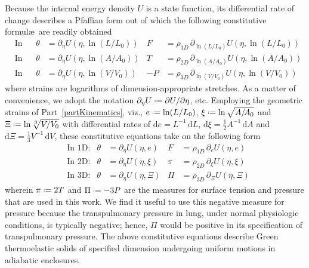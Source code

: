 Because the internal energy density $U$ is a state function, its differential rate of change describes a Pfaffian form \cite{Caratheodory09} out of which the following constitutive formul\ae\ are readily obtained
\begin{subequations}
    \label{GreenElasticCEs}
    \begin{align}
    \mbox{} & \text{In 1D:} & 
    \theta & = \partial_{\eta} U ( \eta , \ln (L/L_0)) &
    F & = \rho_{1D} \, \partial_{\ln(L/L_0)} U ( \eta , \ln (L/L_0) ) \\
    \mbox{} & \text{In 2D:} &
    \theta & = \partial_{\eta} U ( \eta , \ln (A / \! A_0) ) &
    T & = \rho_{2D} \, \partial_{\ln (A / \! A_0)} U ( \eta , \ln (A / A_0) ) \\
    \mbox{} & \text{In 3D:} &
    \theta & = \partial_{\eta} U ( \eta , \ln (V \! / V_0) ) &
    -P & = \rho_{3D} \, \partial_{\ln (V \! / V_0)} U ( \eta , \ln (V \! / V_0) )
    \end{align}
\end{subequations}
where strains are logarithms of dimension-appropriate stretches.  As a matter of convenience, we adopt the notation $\partial_{\eta} U \defeq \partial U / \partial \eta$, etc.  Employing the geometric strains of Part~\ref{partKinematics}, viz., $e \defeq \ln ( L / L_0 )$, $\xi \defeq \ln \sqrt{ A / \! A_0 }$ and $\Xi \defeq \ln \sqrt[3]{V \! / V_0}$ with differential rates of $\mathrm{d} e = L^{-1} \, \mathrm{d}L$, $\mathrm{d} \xi = \tfrac{1}{2} A^{-1} \, \mathrm{d}A$ and $\mathrm{d} \Xi = \tfrac{1}{3} V^{-1} \, \mathrm{d}V$, these constitutive equations take on the following form
\begin{subequations}
    \label{uniformCEs}
    \begin{align}
    \mbox{} & \text{In 1D:} & 
    \theta & = \partial_{\eta} U ( \eta , e) &
    F & = \rho_{1D} \, \partial_e U ( \eta , e ) \\
    \mbox{} & \text{In 2D:} &
    \theta & = \partial_{\eta} U ( \eta , \xi ) &
    \pi & = \rho_{2D} \, \partial_{\xi} U ( \eta , \xi ) \\
    \mbox{} & \text{In 3D:} &
    \theta & = \partial_{\eta} U ( \eta , \Xi ) &
    \Pi & = \rho_{3D} \, \partial_{\Xi} U ( \eta , \Xi )
    \end{align}
\end{subequations}
wherein $\pi \defeq 2T$ and $\Pi \defeq -3P$ are the measures for surface tension and pressure that are used in this work.  We find it useful to use this negative measure for pressure because the transpulmonary pressure in lung, under normal physiologic conditions, is typically negative; hence, $\Pi$ would be positive in its specification of transpulmonary pressure.  The above constitutive equations describe Green thermo\-elastic solids of specified dimension undergoing uniform motions in adiabatic enclosures.

